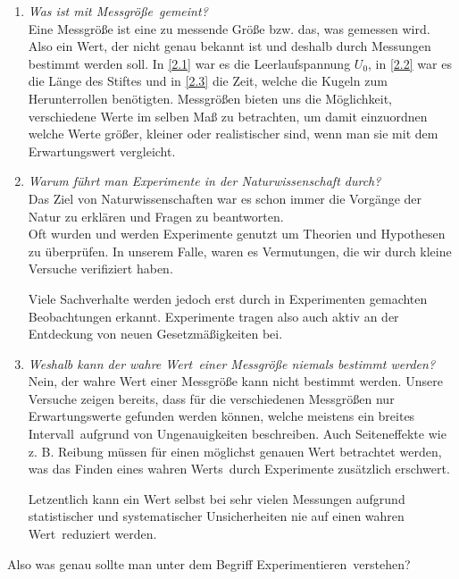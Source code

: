 \documentclass[11pt,a4paper,titlepage, ngerman]{article}
\begin{document}
		\begin{enumerate}
			\item \textit{Was ist mit \glqq Messgröße\grqq\ gemeint?} 
				\vspace{0.2cm}\\
				Eine Messgröße ist eine zu messende Größe bzw. das, was gemessen wird.
				Also ein Wert, der nicht genau bekannt ist und deshalb durch Messungen bestimmt werden soll.
				In \ref{2.1} war es die Leerlaufspannung $U_0$, in \ref{2.2} war es die Länge des Stiftes und in \ref{2.3} die Zeit, welche die Kugeln zum Herunterrollen benötigten.
				Messgrößen bieten uns die Möglichkeit, verschiedene Werte im selben Maß zu betrachten, um damit einzuordnen welche Werte größer, kleiner oder realistischer sind, wenn man sie mit dem Erwartungswert vergleicht. \\
				
			\item \textit{Warum führt man Experimente in der Naturwissenschaft durch?}
				\vspace{0.2cm}\\
				Das Ziel von Naturwissenschaften war es schon immer die Vorgänge der Natur zu erklären und Fragen zu beantworten. \\
				Oft wurden und werden Experimente genutzt um Theorien und Hypothesen zu überprüfen. In unserem Falle, waren es Vermutungen, die wir durch kleine Versuche verifiziert haben.
				
				Viele Sachverhalte werden jedoch erst durch in Experimenten gemachten Beobachtungen erkannt.
				Experimente tragen also auch aktiv an der Entdeckung von neuen Gesetzmäßigkeiten bei.\\
				 
			\item \textit{Weshalb kann der \glqq wahre Wert\grqq\ einer Messgröße niemals bestimmt werden?}
				\vspace{0.2cm}\\
				Nein, der wahre Wert einer Messgröße kann nicht bestimmt werden. Unsere Versuche zeigen bereits, dass für die verschiedenen Messgrößen nur Erwartungswerte gefunden werden können, welche meistens ein \glqq breites Intervall\grqq\ aufgrund von Ungenauigkeiten beschreiben.
				Auch Seiteneffekte wie z. B. Reibung müssen für einen möglichst genauen Wert betrachtet werden, was das Finden eines \glqq wahren Werts\grqq\ durch Experimente zusätzlich erschwert.
				
				Letzentlich kann ein Wert selbst bei sehr vielen Messungen aufgrund statistischer und systematischer Unsicherheiten nie auf einen \glqq wahren Wert\grqq\ reduziert werden.\\
				
		\end{enumerate}
		\newpage
		Also was genau sollte man unter dem Begriff \glqq Experimentieren\grqq\ verstehen? \\
		
\end{document}
